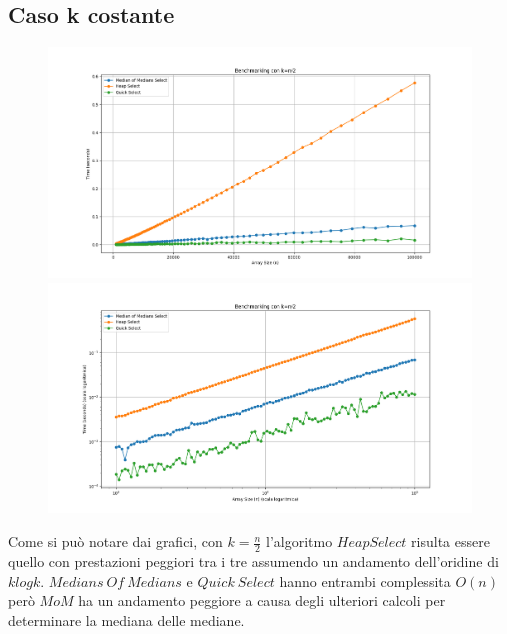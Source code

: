 \documentclass[a4paper]{article}
\begin{document}
\subsection{Caso k costante}
\begin{figure}[h]
            \centering
            \includegraphics[width=.83\textwidth]{graphs/K_const_n.png}
            \includegraphics[width=.83\textwidth]{graphs/K_const_2xlog.png}
\end{figure}
Come si può notare dai grafici, con $k=\frac{n}{2}$ l'algoritmo $HeapSelect$ risulta essere quello con prestazioni peggiori tra i tre assumendo un andamento dell'oridine di $klogk$.
$Medians\ Of\ Medians$ e $Quick\ Select$ hanno entrambi complessita $O(n)$ però $MoM$ ha un andamento peggiore a causa degli ulteriori calcoli per determinare la mediana delle mediane.\\
\newpage
\end{document}
